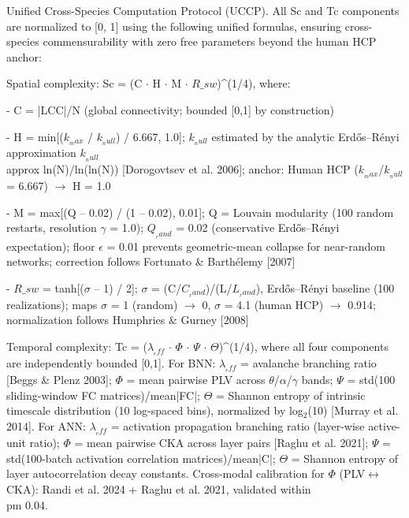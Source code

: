\documentclass[a4paper,12pt]{article}
\begin{document}
Unified Cross-Species Computation Protocol (UCCP). All Sc and Tc components are normalized to [0, 1] using the following unified formulas, ensuring cross-species commensurability with zero free parameters beyond the human HCP anchor:


Spatial complexity: Sc = (C  $\cdot$  H  $\cdot$  M  $\cdot$  $R\_{sw}$)^(1/4), where:


- C = |LCC|/N (global connectivity; bounded [0,1] by construction)


- H = min[($k_{_max}$ / $k_{_null}$) / 6.667, 1.0]; $k_{_null}$ estimated by the analytic Erd\H{o}s--R\'{e}nyi approximation $k_{_null}$  \\approx  ln(N)/ln(ln(N)) [Dorogovtsev et al. 2006]; anchor: Human HCP ($k_{_max}$/$k_{_null}$ = 6.667) $\rightarrow$ H = 1.0


- M = max[(Q -- 0.02) / (1 -- 0.02), 0.01]; Q = Louvain modularity (100 random restarts, resolution $\gamma$ = 1.0); $Q_{_rand}$ = 0.02 (conservative Erd\H{o}s--R\'{e}nyi expectation); floor $\epsilon$ = 0.01 prevents geometric-mean collapse for near-random networks; correction follows Fortunato \& Barth\'{e}lemy [2007]


- $R\_{sw}$ = tanh[($\sigma$ -- 1) / 2]; $\sigma$ = (C/$C_{_rand}$)/(L/$L_{_rand}$), Erd\H{o}s--R\'{e}nyi baseline (100 realizations); maps $\sigma$ = 1 (random) $\rightarrow$ 0, $\sigma$ = 4.1 (human HCP) $\rightarrow$ 0.914; normalization follows Humphries \& Gurney [2008]


Temporal complexity: Tc = ($\lambda_{_eff}$  $\cdot$  $\Phi$  $\cdot$  $\Psi$  $\cdot$  $\Theta$)^(1/4), where all four components are independently bounded [0,1]. For BNN: $\lambda_{_eff}$ = avalanche branching ratio [Beggs \& Plenz 2003]; $\Phi$ = mean pairwise PLV across $\theta$/$\alpha$/$\gamma$ bands; $\Psi$ = std(100 sliding-window FC matrices)/mean|FC|; $\Theta$ = Shannon entropy of intrinsic timescale distribution (10 log-spaced bins), normalized by log$_2$(10) [Murray et al. 2014]. For ANN: $\lambda_{_eff}$ = activation propagation branching ratio (layer-wise active-unit ratio); $\Phi$ = mean pairwise CKA across layer pairs [Raghu et al. 2021]; $\Psi$ = std(100-batch activation correlation matrices)/mean|C|; $\Theta$ = Shannon entropy of layer autocorrelation decay constants. Cross-modal calibration for $\Phi$ (PLV$\leftrightarrow$CKA): Randi et al. 2024 + Raghu et al. 2021, validated within  \\pm 0.04.
\end{document}
